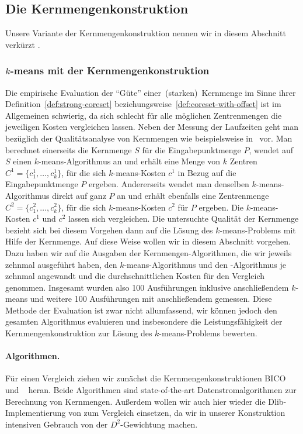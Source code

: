 \subsection{Die Kernmengenkonstruktion}
\label{subsection:experiment-coreset}

Unsere Variante der Kernmengenkonstruktion nennen wir in diesem Abschnitt verkürzt \CsTwo.

\subsubsection{\texorpdfstring{$k$}{k}-means mit der Kernmengenkonstruktion}
Die empirische Evaluation der "`Güte"' einer~(starken)~Kernmenge im Sinne ihrer Definition~\ref{def:strong-coreset}
beziehungsweise~\ref{def:coreset-with-offset} ist im Allgemeinen schwierig, da sich schlecht für alle möglichen Zentrenmengen
die jeweiligen Kosten vergleichen lassen. Neben der Messung der Laufzeiten geht man bezüglich der Qualitätsanalyse von Kernmengen
wie beispielsweise in~\cite{AckermannMRSLS12,FichtenbergerGSSS13} vor. Man berechnet einerseits die Kernmenge $S$ für die
Eingabepunktmenge $P$, wendet auf $S$ einen $k$-means-Algorithmus an und erhält eine Menge von $k$ Zentren
$C^1 = \{c_1^1, \dots, c_k^1\}$, für die sich $k$-means-Kosten $c^1$ in Bezug auf die Eingabepunktmenge $P$ ergeben.
Andererseits wendet man denselben $k$-means-Algorithmus direkt auf ganz $P$ an und erhält ebenfalls eine Zentrenmenge
$C^2 = \{c_1^2, \dots, c_k^2\}$, für die sich $k$-means-Kosten $c^2$ für $P$ ergeben. Die $k$-means-Kosten $c^1$ und $c^2$ lassen
sich vergleichen. Die untersuchte Qualität der Kernmenge bezieht sich bei diesem Vorgehen dann auf die Lösung des
$k$-means-Problems mit Hilfe der Kernmenge.
\absatz
Auf diese Weise wollen wir in diesem Abschnitt vorgehen. Dazu haben wir auf die Ausgaben der Kernmengen-Algorithmen,
die wir jeweils zehnmal ausgeführt haben, den $k$-means-Algorithmus und den \kmpp-Algorithmus je zehnmal angewandt und die
durchschnittlichen Kosten für den Vergleich genommen. Insgesamt wurden also 100 Ausführungen inklusive anschließendem $k$-means und
weitere 100 Ausführungen mit anschließendem \kmpp{} gemessen.
Diese Methode der Evaluation ist zwar nicht allumfassend, wir können jedoch den gesamten Algorithmus evaluieren und insbesondere
die Leistungsfähigkeit der Kernmengenkonstruktion zur Lösung des $k$-means-Problems bewerten.
\paragraph{Algorithmen.} Für einen Vergleich ziehen wir zunächst die Kernmengenkonstruktionen BICO~\cite{FichtenbergerGSSS13}
und \Skmpp~\cite{AckermannMRSLS12} heran. Beide Algorithmen sind state-of-the-art Datenstromalgorithmen zur Berechnung von
Kernmengen. Außerdem wollen wir auch hier wieder die Dlib-Implementierung von \kmpp{} zum Vergleich einsetzen, da wir in
unserer Konstruktion intensiven Gebrauch von der $D^2$-Gewichtung machen.
